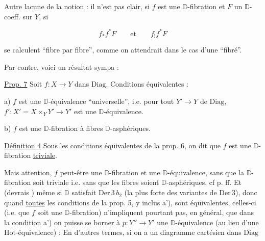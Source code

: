 
Autre lacune de la notion : il n'est pas clair, si $f$ est une $\mathbb D$-fibration et $F$ un  $\mathbb D$-coeff. sur $Y$, si 

\[ f_*f^*F\qquad\text{et}\qquad f_!f^*F \]

se calculent ``fibre par fibre'', comme on attendrait dans le cas d'une ``fibré''.

Par contre, voici un résultat sympa :


\margin{$\unsure{\times|\ast}$}

\uline{Prop. 7} Soit $f:X\longrightarrow Y$ dans $\mathrm{Diag}$. Conditions équivalentes :

a) $f$ est une $\mathbb D$-équivalence ``universelle'', i.e. pour tout $Y'\longrightarrow Y$ de $\mathrm{Diag}$, $f':X'=X\times_Y Y'\longrightarrow Y'$ est une $\mathbb D$-équivalence.

b) $f$ est une $\mathbb D$-fibration à fibres $\mathbb D$-asphériques.

\uline{Définition 4} Sous les conditions équivalentes de la prop. 6, on dit que $f$ est une $\mathbb D$-fibration \uline{triviale}.


Mais attention, $f$ peut-être une $\mathbb D$-fibration et une $\mathbb D$-équivalence, sans que la $\mathbb D$-fibration soit triviale i.e. sans que les fibres soient $\mathbb D$-asphériques, cf p.  ff. Et  (devrais ) même si $\mathbb D$ satisfait $\mathrm{Der}\,3\,b_2$ (la plus forte des variantes de $\mathrm{Der}\,3$), donc quand \uline{toutes} les conditions de la prop. 5, y inclus a'), sont équivalentes, celles-ci (i.e. que $f$ soit une $\mathbb D$-fibration) n'impliquent pourtant pas, en général, que dans la condition a') on puisse se borner à $p:Y''\longrightarrow Y'$ une $\mathbb D$-équivalence (au lieu d'une Hot-équivalence) : En d'autres termes, si on a un diagramme cartésien dans $\mathrm{Diag}$

